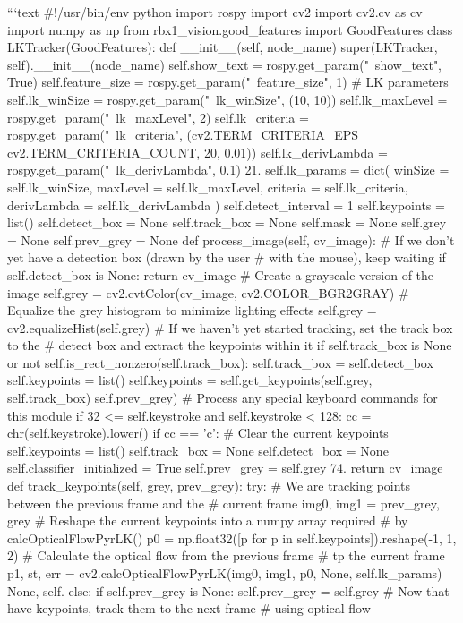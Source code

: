 ```text
#!/usr/bin/env python 
import rospy
import cv2
import cv2.cv as cv
import numpy as np
from rbx1_vision.good_features import GoodFeatures
class LKTracker(GoodFeatures):
def __init__(self, node_name)
super(LKTracker, self).__init__(node_name)
self.show_text = rospy.get_param("~show_text", True)
self.feature_size = rospy.get_param("~feature_size", 1)
# LK parameters
self.lk_winSize = rospy.get_param("~lk_winSize", (10, 10))
self.lk_maxLevel = rospy.get_param("~lk_maxLevel", 2)
self.lk_criteria = rospy.get_param("~lk_criteria",
(cv2.TERM_CRITERIA_EPS | cv2.TERM_CRITERIA_COUNT, 20, 0.01))
self.lk_derivLambda = rospy.get_param("~lk_derivLambda", 0.1) 21.
self.lk_params = dict( winSize = self.lk_winSize,
maxLevel = self.lk_maxLevel,
criteria = self.lk_criteria,
derivLambda = self.lk_derivLambda )
self.detect_interval = 1
self.keypoints = list()
self.detect_box = None
self.track_box = None
self.mask = None
self.grey = None
self.prev_grey = None
def process_image(self, cv_image):
# If we don't yet have a detection box (drawn by the user
# with the mouse), keep waiting
if self.detect_box is None:
return cv_image
# Create a grayscale version of the image
self.grey = cv2.cvtColor(cv_image, cv2.COLOR_BGR2GRAY)
# Equalize the grey histogram to minimize lighting effects
self.grey = cv2.equalizeHist(self.grey)
# If we haven't yet started tracking, set the track box to the
# detect box and extract the keypoints within it
if self.track_box is None or not
self.is_rect_nonzero(self.track_box):
self.track_box = self.detect_box
self.keypoints = list()
self.keypoints = self.get_keypoints(self.grey,
self.track_box) 
self.prev_grey) 
# Process any special keyboard commands for this module
if 32 <= self.keystroke and self.keystroke < 128:
cc = chr(self.keystroke).lower()
if cc == 'c':
# Clear the current keypoints
self.keypoints = list()
self.track_box = None
self.detect_box = None
self.classifier_initialized = True
self.prev_grey = self.grey 74.
return cv_image
def track_keypoints(self, grey, prev_grey):
try:
# We are tracking points between the previous frame and the
# current frame
img0, img1 = prev_grey, grey
# Reshape the current keypoints into a numpy array required
# by calcOpticalFlowPyrLK()
p0 = np.float32([p for p in self.keypoints]).reshape(-1, 1,
2) 
# Calculate the optical flow from the previous frame
# tp the current frame
p1, st, err = cv2.calcOpticalFlowPyrLK(img0, img1, p0,
None, \textbf{}self.lk_params) 
None, \textbf{}self.
else:
if self.prev_grey is None:
self.prev_grey = self.grey
# Now that have keypoints, track them to the next frame # using optical flow
